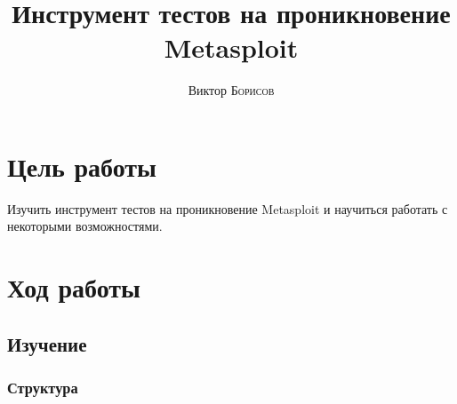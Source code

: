 \documentclass[10pt,a4paper]{article}
\title{Инструмент тестов на проникновение Metasploit} %
\author{Виктор \textsc{Борисов}} %
\begin{document}
\maketitle %

\newpage

\tableofcontents

\newpage


\section{Цель работы}

Изучить инструмент тестов на проникновение Metasploit и научиться работать с некоторыми возможностями.


\section{Ход работы}

\subsection{Изучение}
\label{theory}

\subsubsection{Структура}
\end{document}
